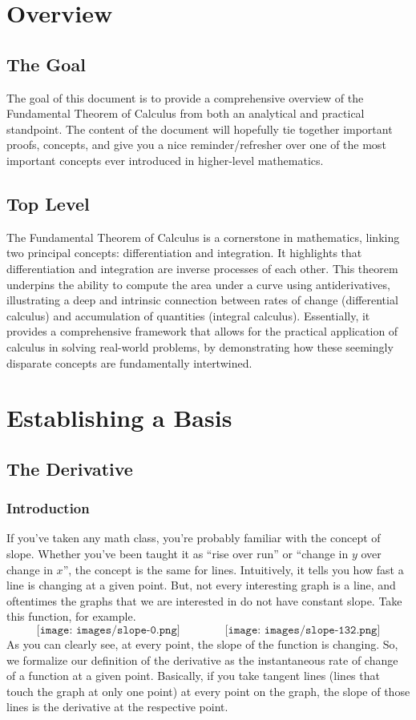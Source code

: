 
\pagebreak
\section{Overview}
\subsection{The Goal}
The goal of this document is to provide a comprehensive overview of the Fundamental Theorem of Calculus from both an analytical and practical standpoint. The content of the document will hopefully tie together important proofs, concepts, and give you a nice reminder/refresher over one of the most important concepts ever introduced in higher-level mathematics.
\subsection{Top Level}
The Fundamental Theorem of Calculus is a cornerstone in mathematics, linking two principal concepts: differentiation and integration. It highlights that differentiation and integration are inverse processes of each other. This theorem underpins the ability to compute the area under a curve using antiderivatives, illustrating a deep and intrinsic connection between rates of change (differential calculus) and accumulation of quantities (integral calculus). Essentially, it provides a comprehensive framework that allows for the practical application of calculus in solving real-world problems, by demonstrating how these seemingly disparate concepts are fundamentally intertwined.
\section{Establishing a Basis}
\subsection{The Derivative}
\subsubsection{Introduction}
If you've taken any math class, you're probably familiar with the concept of slope. Whether you've been taught it as ``rise over run'' or ``change in $y$ over change in $x$'', the concept is the same for lines. Intuitively, it tells you how fast a line is changing at a given point. But, not every interesting graph is a line, and oftentimes the graphs that we are interested in do not have constant slope. Take this function, for example.
\vspace{0.5cm}
$$
\texttt{[image: images/slope-0.png]} \quad \quad \quad \quad \texttt{[image: images/slope-132.png]}
$$
As you can clearly see, at every point, the slope of the function is changing. So, we formalize our definition of the derivative as the instantaneous rate of change of a function at a given point. Basically, if you take tangent lines (lines that touch the graph at only one point) at every point on the graph, the slope of those lines is the derivative at the respective point.
